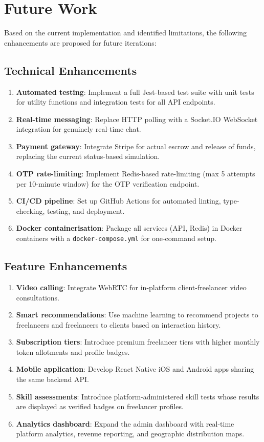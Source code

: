 \section{Future Work}

Based on the current implementation and identified limitations, the following enhancements are proposed for future iterations:

\subsection{Technical Enhancements}

\begin{enumerate}
  \item \textbf{Automated testing}: Implement a full Jest-based test suite with unit tests for utility functions and integration tests for all API endpoints.
  \item \textbf{Real-time messaging}: Replace HTTP polling with a Socket.IO WebSocket integration for genuinely real-time chat.
  \item \textbf{Payment gateway}: Integrate Stripe for actual escrow and release of funds, replacing the current status-based simulation.
  \item \textbf{OTP rate-limiting}: Implement Redis-based rate-limiting (max 5 attempts per 10-minute window) for the OTP verification endpoint.
  \item \textbf{CI/CD pipeline}: Set up GitHub Actions for automated linting, type-checking, testing, and deployment.
  \item \textbf{Docker containerisation}: Package all services (API, Redis) in Docker containers with a \texttt{docker-compose.yml} for one-command setup.
\end{enumerate}

\subsection{Feature Enhancements}

\begin{enumerate}
  \item \textbf{Video calling}: Integrate WebRTC for in-platform client-freelancer video consultations.
  \item \textbf{Smart recommendations}: Use machine learning to recommend projects to freelancers and freelancers to clients based on interaction history.
  \item \textbf{Subscription tiers}: Introduce premium freelancer tiers with higher monthly token allotments and profile badges.
  \item \textbf{Mobile application}: Develop React Native iOS and Android apps sharing the same backend API.
  \item \textbf{Skill assessments}: Introduce platform-administered skill tests whose results are displayed as verified badges on freelancer profiles.
  \item \textbf{Analytics dashboard}: Expand the admin dashboard with real-time platform analytics, revenue reporting, and geographic distribution maps.
\end{enumerate}

